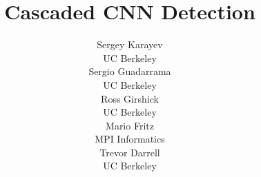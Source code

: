 
\title{Cascaded CNN Detection}

\author{
Sergey Karayev\\ UC Berkeley\\
\And Sergio Guadarrama\\ UC Berkeley\\
\And Ross Girshick\\ UC Berkeley\\
\AND Mario Fritz\\ MPI Informatics\\
\And Trevor Darrell\\ UC Berkeley\\
}

\nipsfinalcopy


\maketitle









\small{

}

